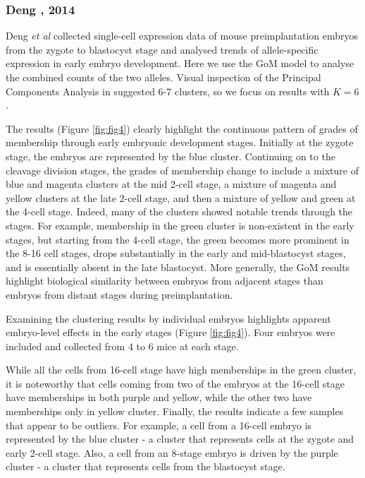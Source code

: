 
\subsubsection{Deng , 2014}

Deng \textit{et al} collected single-cell expression data of mouse preimplantation embryos from the zygote to blastocyst stage \cite{Deng2014} and analysed trends of allele-specific expression in early embryo development. Here we use the GoM model to analyse the combined counts of the two alleles. Visual inspection of the Principal Components Analysis in \cite{Deng2014} suggested 6-7 clusters, so we focus on results with $K=6$. 

The results (Figure \ref{fig:fig4}) clearly highlight the continuous pattern of grades of membership through early embryonic development stages. Initially at the zygote stage, the embryos are represented by the blue cluster. Continuing on to the cleavage division stages, the grades of membership change to include a mixture of blue and magenta clusters at the mid 2-cell stage, a mixture of magenta and yellow clusters at the late 2-cell stage, and then a mixture of yellow and green at the 4-cell stage. Indeed, many of the clusters showed notable trends through the stages. For example, membership in the green cluster is non-existent in the early stages, but starting from the 4-cell stage, the green becomes more prominent in the 8-16 cell stages, drops substantially in the early and mid-blastocyst stages, and is essentially absent in the late blastocyst. More generally, the GoM results highlight biological similarity between embryos from adjacent stages than embryos from distant stages during preimplantation. 

Examining the clustering results by individual embryos highlights apparent embryo-level effects in the early stages (Figure \ref{fig:fig4}). Four embryos were included and collected from 4 to 6 mice at each stage. 


While all the cells from 16-cell stage have high memberships in the green cluster, it is noteworthy that cells coming from two of the embryos at the 16-cell stage have memberships in both purple and yellow, while the other two  have memberships only in yellow cluster. Finally, the results indicate a few samples that appear to be outliers. For example, a cell from a 16-cell embryo is represented by the blue cluster - a cluster that represents cells at the zygote and early 2-cell stage. Also, a cell from an 8-stage embryo is driven by the purple cluster - a cluster that represents cells from the blastocyst stage.

